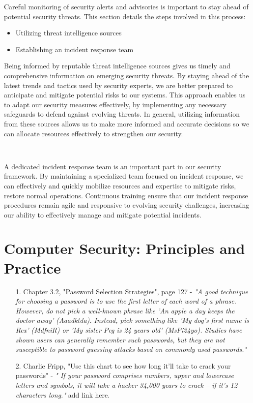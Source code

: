 \documentclass[12pt,a4paper]{report}
\begin{document}
Careful monitoring of security alerts and advisories is important to stay ahead of potential security threats. 
This section details the steps involved in this process:
\begin{itemize}
 \item Utilizing threat intelligence sources
 \item Establishing an incident response team
\end{itemize}

Being informed by reputable threat intelligence sources gives us timely and comprehensive information on emerging security threats. 
By staying ahead of the latest trends and tactics used by security experts, we are better prepared to anticipate and mitigate potential risks to our systems.
This approach enables us to adapt our security measures effectively, by implementing any necessary safeguards to defend against evolving threats.
In general, utilizing information from these sources allows us to make more informed and accurate decisions so we can allocate resources effectively to strengthen our security.

\

A dedicated incident response team is an important part in our security framework.
By maintaining a specialized team focused on incident response, we can effectively and quickly mobilize resources and expertise to mitigate risks, restore normal operations. 
Continuous training ensure that our incident response procedures remain agile and responsive to evolving security challenges, increasing our ability to effectively manage and mitigate potential incidents.

\appendix
\chapter{Computer Security: Principles and Practice}
\label{sec:appendix}
\begin{enumerate}
 \item[1.] Chapter 3.2, "Password Selection Strategies", page 127 - \textit{"A good technique for choosing a password is to use the first letter of each word of a phrase.
However, do not pick a well-known phrase like 'An apple a day keeps the doctor away' (Aaadktda).
Instead, pick something like 'My dog's first name is Rex' (MdfniR) or 'My sister Peg
is 24 years old' (MsPi24yo).
Studies have shown users can generally remember such passwords, but they are not susceptible to password guessing attacks based on commonly used passwords."}
 \item[2.] Charlie Fripp, "Use this chart to see how long it’ll take to crack your passwords" - \textit{" If your password comprises numbers, upper and lowercase letters and symbols, it will take a hacker 34,000 years to crack – if it’s 12 characters long."} add link here.
 
\end{enumerate}
\end{document}
